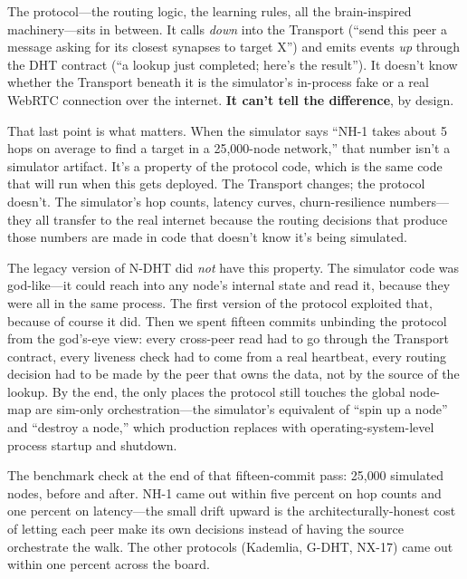 \documentclass[nobib]{tufte-handout}
\begin{document}
The protocol---the routing logic, the learning rules, all the brain-inspired machinery---sits in between. It calls \emph{down} into the Transport (``send this peer a message asking for its closest synapses to target X'') and emits events \emph{up} through the DHT contract (``a lookup just completed; here's the result''). It doesn't know whether the Transport beneath it is the simulator's in-process fake or a real WebRTC connection over the internet. \textbf{It can't tell the difference}, by design.

That last point is what matters. When the simulator says ``NH-1 takes about 5 hops on average to find a target in a 25{,}000-node network,'' that number isn't a simulator artifact. It's a property of the protocol code, which is the same code that will run when this gets deployed. The Transport changes; the protocol doesn't. The simulator's hop counts, latency curves, churn-resilience numbers---they all transfer to the real internet because the routing decisions that produce those numbers are made in code that doesn't know it's being simulated.

The legacy version of N-DHT did \emph{not} have this property. The simulator code was god-like---it could reach into any node's internal state and read it, because they were all in the same process. The first version of the protocol exploited that, because of course it did. Then we spent fifteen commits unbinding the protocol from the god's-eye view: every cross-peer read had to go through the Transport contract, every liveness check had to come from a real heartbeat, every routing decision had to be made by the peer that owns the data, not by the source of the lookup. By the end, the only places the protocol still touches the global node-map are sim-only orchestration---the simulator's equivalent of ``spin up a node'' and ``destroy a node,'' which production replaces with operating-system-level process startup and shutdown.

The benchmark check at the end of that fifteen-commit pass: 25{,}000 simulated nodes, before and after. NH-1 came out within five percent on hop counts and one percent on latency---the small drift upward is the architecturally-honest cost of letting each peer make its own decisions instead of having the source orchestrate the walk. The other protocols (Kademlia, G-DHT, NX-17) came out within one percent across the board.
\end{document}
